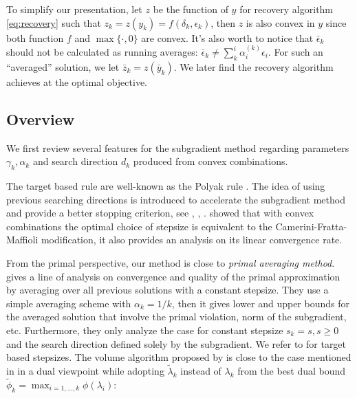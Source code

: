 \documentclass[../main]{subfiles}
\begin{document}
To simplify our presentation, let
\(z\) be the function of \(y\) for recovery algorithm \eqref{eq:recovery} such that \(z_k = z(y_k) = f(\delta_k, \epsilon_k)\), then \(z\) is
also convex in \(y\) since both function \(f\) and \(\max\{\cdot, 0\}\)
are convex. It's also worth to notice that \(\bar \epsilon_k\) should
not be calculated as running averages:
\(\bar \epsilon_k \neq \sum^i_k \alpha_i^{(k)} \epsilon_i\). For such an
``averaged'' solution, we let
\(\bar z_k = z(\bar y_k)\). We later find the recovery algorithm achieves
at the optimal objective.

\subsection{Overview}\label{sec:dual.overview}


We first review several features for the subgradient method regarding
parameters \(\gamma_k, \alpha_k\) and search direction \(d_k\) produced from convex combinations.

The target based rule are well-known as the Polyak rule \cite{polyak_general_1967}.
The idea of using previous searching directions is introduced to accelerate the subgradient method and provide a better stopping criterion,
see \cite{camerini_improving_1975}, \cite{brannlund_generalized_1995}, \cite{barahona_volume_2000}.
\cite{brannlund_generalized_1995} showed that with convex combinations the optimal choice of stepsize is
equivalent to the Camerini-Fratta-Maffioli modification, it also provides an analysis on its linear convergence rate.

From the primal perspective, our method is close to \emph{primal
  averaging method}. \cite{nedic_approximate_2009}
gives a line of analysis on convergence and quality of the primal
approximation by averaging over all previous solutions with a constant
stepsize. They use a simple averaging scheme with \(\alpha_k = 1/k\),
then it gives lower and upper bounds for the averaged solution
that involve the primal violation, norm of the subgradient, etc. Furthermore, they only analyze the case for constant
stepsize \(s_k = s, s\ge 0\) and the search direction defined solely by
the subgradient. We refer to \cite{kiwiel_lagrangian_2007} for target based
stepsizes. The volume algorithm proposed by \cite{barahona_volume_2000} is close to the
case mentioned in \cite{brannlund_generalized_1995} in a dual
viewpoint while adopting \(\tilde \lambda_{k}\) instead of \(\lambda_k\) from the best dual bound
\(\tilde \phi_k = \max_{i=1, ..., k} \phi(\lambda_i)\):
\end{document}
